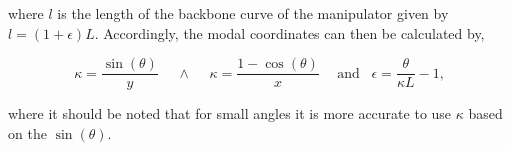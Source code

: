 where $l$ is the length of the backbone curve of the manipulator given by $l = (1+\epsilon)L$. Accordingly, the modal coordinates can then be calculated by,

\begin{equation}
    \kappa = \frac{\sin(\theta)}{y} \hspace{15pt} 	\land \hspace{15pt}  \kappa = \frac{1 -\cos(\theta)}{x} \hspace{15pt} \text{and} \hspace{10pt} \epsilon = \frac{\theta}{\kappa L} -1,
\end{equation}

where it should be noted that for small angles it is more accurate to use $\kappa$ based on the $\sin(\theta)$.


